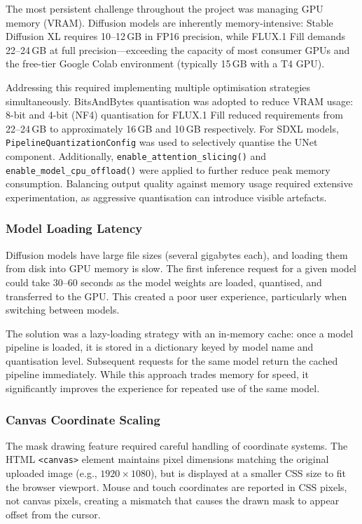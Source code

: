 \documentclass[12pt,a4paper]{report}
\begin{document}
The most persistent challenge throughout the project was managing GPU memory (VRAM). Diffusion models are inherently memory-intensive: Stable Diffusion XL requires 10--12\,GB in FP16 precision, while FLUX.1 Fill demands 22--24\,GB at full precision---exceeding the capacity of most consumer GPUs and the free-tier Google Colab environment (typically 15\,GB with a T4 GPU).

Addressing this required implementing multiple optimisation strategies simultaneously. BitsAndBytes quantisation was adopted to reduce VRAM usage: 8-bit and 4-bit (NF4) quantisation for FLUX.1 Fill reduced requirements from 22--24\,GB to approximately 16\,GB and 10\,GB respectively. For SDXL models, \texttt{Pipeline\-Quantization\-Config} was used to selectively quantise the UNet component. Additionally, \texttt{enable\_\-attention\_\-slicing()} and \texttt{enable\_\-model\_\-cpu\_\-offload()} were applied to further reduce peak memory consumption. Balancing output quality against memory usage required extensive experimentation, as aggressive quantisation can introduce visible artefacts.

\subsubsection{Model Loading Latency}

Diffusion models have large file sizes (several gigabytes each), and loading them from disk into GPU memory is slow. The first inference request for a given model could take 30--60 seconds as the model weights are loaded, quantised, and transferred to the GPU. This created a poor user experience, particularly when switching between models.

The solution was a lazy-loading strategy with an in-memory cache: once a model pipeline is loaded, it is stored in a dictionary keyed by model name and quantisation level. Subsequent requests for the same model return the cached pipeline immediately. While this approach trades memory for speed, it significantly improves the experience for repeated use of the same model.

\subsubsection{Canvas Coordinate Scaling}

The mask drawing feature required careful handling of coordinate systems. The HTML \texttt{<canvas>} element maintains pixel dimensions matching the original uploaded image (e.g., $1920 \times 1080$), but is displayed at a smaller CSS size to fit the browser viewport. Mouse and touch coordinates are reported in CSS pixels, not canvas pixels, creating a mismatch that causes the drawn mask to appear offset from the cursor.
\end{document}
